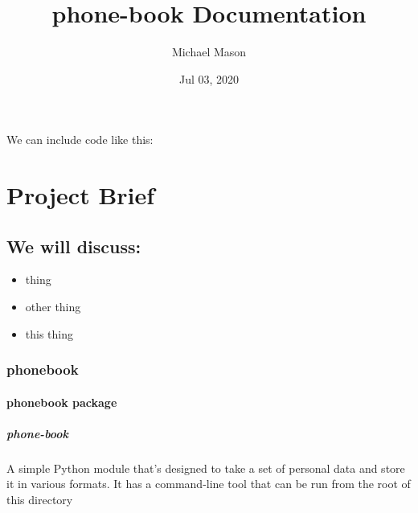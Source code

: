 \documentclass[letterpaper,10pt,english]{sphinxmanual}
\title{phone-book Documentation}
\date{Jul 03, 2020}
\author{Michael Mason}
\begin{document}
\pagestyle{empty}
\sphinxmaketitle
\pagestyle{plain}
\sphinxtableofcontents
\pagestyle{normal}
\label{\detokenize{index::doc}}


We can include code like this:

\begin{sphinxVerbatim}[commandchars=\\\{\}]
 
 
\end{sphinxVerbatim}


\chapter{Project Brief}
\label{\detokenize{index:project-brief}}

\section{We will discuss:}
\label{\detokenize{index:we-will-discuss}}\begin{itemize}
\item {} 
thing

\item {} 
other thing

\item {} 
this thing

\end{itemize}


\subsection{phonebook}
\label{\detokenize{index:phonebook}}

\subsubsection{phonebook package}
\label{\detokenize{phonebook:module-phonebook}}\label{\detokenize{phonebook:phonebook-package}}\label{\detokenize{phonebook::doc}}

\paragraph{phone-book}
\label{\detokenize{phonebook:phone-book}}
A simple Python module that’s designed to take a set of personal data and store it in various formats. It has a command-line tool that can be run from the root of this directory
\end{document}
